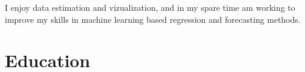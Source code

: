 \documentclass[print, oneside]{friggeri-cv} %
\begin{document}
\begin{entrylist}
{%
\quad I enjoy data estimation and vizualization, and in my spare time am working to improve my skills in machine learning based regression and forecasting methods.
}




\end{entrylist}



\section{Education}
\end{document}

